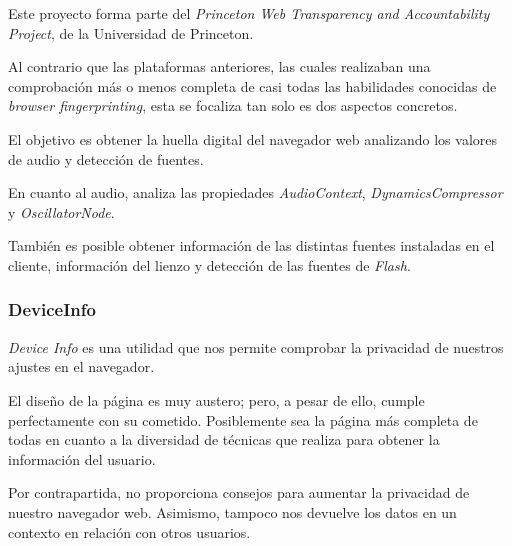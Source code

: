 Este proyecto forma parte del \textit{Princeton Web Transparency and Accountability Project}, de la Universidad de Princeton\cite{audio_page}. \par 

Al contrario que las plataformas anteriores, las cuales realizaban una comprobación más o menos completa de casi todas las habilidades conocidas de \textit{browser fingerprinting}, esta se focaliza tan solo es dos aspectos concretos. \par 

El objetivo es obtener la huella digital del navegador web analizando los valores de audio y detección de fuentes. \par 

En cuanto al audio, analiza las propiedades \textit{AudioContext}, \textit{DynamicsCompressor} y \textit{OscillatorNode}. \par 

También es posible obtener información de las distintas fuentes instaladas en el cliente, información del lienzo y detección de las fuentes de \textit{Flash}. \par 

\subsubsection{DeviceInfo}

\textit{Device Info}\cite{deviceinfo} es una utilidad que nos permite comprobar la privacidad de nuestros ajustes en el navegador. \par

El diseño de la página es muy austero; pero, a pesar de ello, cumple perfectamente con su cometido. Posiblemente sea la página más completa de todas en cuanto a la diversidad de técnicas que realiza para obtener la información del usuario. \par

Por contrapartida, no proporciona consejos para aumentar la privacidad de nuestro navegador web. Asimismo, tampoco nos devuelve los datos en un contexto en relación con otros usuarios. \par

